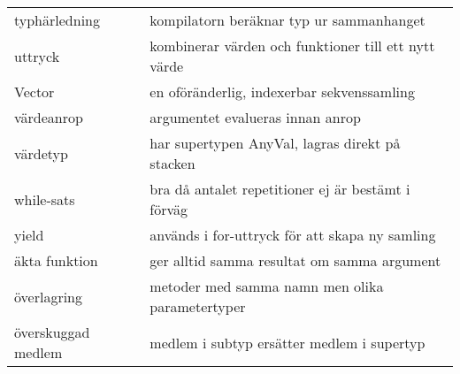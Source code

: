 \begin{tabular}{l|l}
typhärledning & kompilatorn beräknar typ ur sammanhanget \\
uttryck & kombinerar värden och funktioner till ett nytt värde \\
Vector & en oföränderlig, indexerbar sekvenssamling \\
värdeanrop & argumentet evalueras innan anrop \\
värdetyp & har supertypen AnyVal, lagras direkt på stacken \\
while-sats & bra då antalet repetitioner ej är bestämt i förväg \\
yield & används i for-uttryck för att skapa ny samling \\
äkta funktion & ger alltid samma resultat om samma argument \\
överlagring & metoder med samma namn men olika parametertyper \\
överskuggad medlem & medlem i subtyp ersätter medlem i supertyp \\
\end{tabular}
